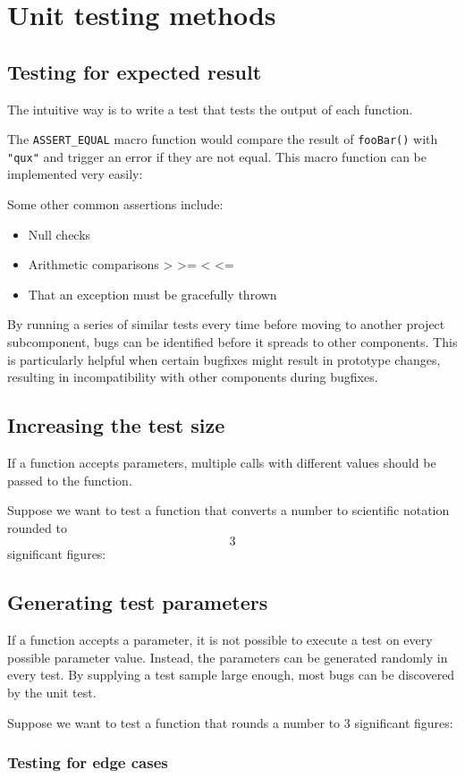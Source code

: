 \section{Unit testing methods}
\subsection{Testing for expected result}
The intuitive way is to write a test that tests the output of each function.


The \texttt{ASSERT\_EQUAL} macro function would compare the result of \texttt{fooBar()} with \texttt{"qux"} and trigger an error if they are not equal.
This macro function can be implemented very easily:


Some other common assertions include:
\begin{itemize}
	\item Null checks
	\item Arithmetic comparisons > >= < <=
	\item That an exception must be gracefully thrown
\end{itemize}

By running a series of similar tests every time before moving to another project subcomponent,
bugs can be identified before it spreads to other components.
This is particularly helpful when certain bugfixes might result in prototype changes,
resulting in incompatibility with other components during bugfixes.

\subsection{Increasing the test size}
If a function accepts parameters, multiple calls with different values should be passed to the function.

Suppose we want to test a function that converts a number to scientific notation rounded to $$3$$ significant figures:


\subsection{Generating test parameters}
If a function accepts a parameter, it is not possible to execute a test on every possible parameter value.
Instead, the parameters can be generated randomly in every test.
By supplying a test sample large enough, most bugs can be discovered by the unit test.

Suppose we want to test a function that rounds a number to 3 significant figures:


\subsubsection{Testing for edge cases}
